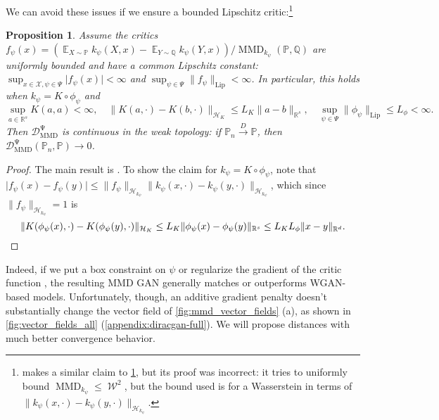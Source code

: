 \documentclass{article}
\newcommand{\distconv}{\xrightarrow{D}}
\DeclareMathOperator{\E}{\mathbb E}
\newcommand{\h}{\mathcal H}
\newcommand{\R}{\mathbb R}
\newcommand{\PP}{\mathbb P}
\newcommand{\QQ}{\mathbb Q}
\newcommand{\x}{\mathcal X}
\newcommand{\lip}{\mathrm{Lip}}
\DeclareMathOperator{\MMD}{MMD}
\newcommand{\optMMD}[1][\Psi]{\operatorname{\mathcal D_{\mathrm{MMD}}^{#1}}}
\DeclareMathOperator{\W}{\mathcal{W}}
\newtheorem{prop}[lem]{Proposition}
\begin{document}
We can avoid these issues if we ensure a bounded Lipschitz critic:\footnote{\cite[Theorem 4]{mmd-gan} makes a similar claim to \cref{prop:optmmd:weakness}, but its proof was incorrect: it tries to uniformly bound $\MMD_{k_\psi} \le \W^2$, but the bound used is for a Wasserstein in terms of $\lVert k_\psi(x, \cdot) - k_\psi(y, \cdot) \rVert_{\h_{k_\psi}}$.}
\begin{prop} \label{prop:optmmd:weakness}
  Assume the critics
  $
    f_\psi(x) = (\E_{X \sim \PP} k_\psi(X, x) - \E_{Y \sim \QQ} k_\psi(Y, x)) / \MMD_{k_\psi}(\PP, \QQ)
  $
  are uniformly bounded and have a common Lipschitz constant:
  $\sup_{x \in \x, \psi \in \Psi} \lvert f_\psi(x) \rvert < \infty$ and
  $\sup_{\psi \in \Psi} \lVert f_\psi \rVert_\lip < \infty$.
In particular, this holds when $k_\psi = K \circ \phi_\psi$ and
\[
    \sup_{a \in \R^s} K(a, a) < \infty
    ,\quad
    \lVert K(a, \cdot) - K(b, \cdot) \rVert_{\h_K} \le L_K \lVert a - b \rVert_{\R^s}
    ,\quad
    \sup_{\psi \in \Psi} \lVert \phi_\psi \rVert_\lip \le L_\phi < \infty
    \label{eq:stack-kernel-weakness}
  .\]
Then $\optMMD$ is continuous in the weak topology:
  if $\PP_n \distconv \PP$, then $\optMMD(\PP_n, \PP) \to 0$.
\end{prop}
\begin{proof}
  The main result is \cite[Corollary 11.3.4]{dudley:analysis}.
To show the claim for $k_\psi = K \circ \phi_\psi$, note that
  $\lvert f_\psi(x) - f_\psi(y) \rvert
  \le \lVert f_\psi \rVert_{\h_{k_\psi}} \lVert k_\psi(x, \cdot) - k_\psi(y, \cdot) \rVert_{\h_{k_\psi}}$,
  which since $\lVert f_\psi \rVert_{\h_{k_\psi}} = 1$ is
\[
     \lVert K(\phi_\psi(x), \cdot) - K(\phi_\psi(y), \cdot) \rVert_{\h_K}
     \le L_K \lVert \phi_\psi(x) - \phi_\psi(y) \rVert_{\R^s}
     \le L_K L_\phi \lVert x - y \rVert_{\R^d}
  . \qedhere\]
\end{proof}

Indeed, if we put a box constraint on $\psi$ \parencite{mmd-gan}
or regularize the gradient of the critic function \parencite{Binkowski:2018},
the resulting MMD GAN generally matches or outperforms WGAN-based models.
Unfortunately, though,
an additive gradient penalty doesn't substantially change the vector field of \cref{fig:mmd_vector_fields} (a),
as shown in \cref{fig:vector_fields_all} (\cref{appendix:diracgan-full}).
We will propose distances with much better convergence behavior.
\end{document}
